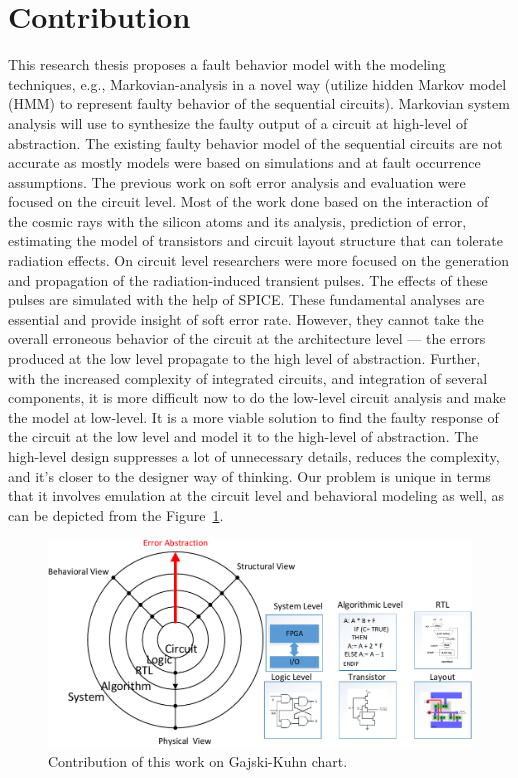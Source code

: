   
\section{Contribution}

This research thesis proposes a fault behavior model with the modeling techniques, e.g., Markovian-analysis in a novel way (utilize hidden Markov model (HMM) to represent faulty behavior of the sequential circuits). Markovian system analysis will use to synthesize the faulty output of a circuit at high-level of abstraction. The existing faulty behavior model of the sequential circuits are not accurate as mostly models were based on simulations and at fault occurrence assumptions. 
The previous work on soft error analysis and evaluation were focused on the circuit level. Most of the work done based on the interaction of the cosmic rays with the silicon atoms and its analysis, prediction of error, estimating the model of transistors and circuit layout structure that can tolerate radiation effects. On circuit level researchers were more focused on the generation and propagation of the radiation-induced transient pulses. The effects of these pulses are simulated with the help of SPICE. These fundamental analyses are essential and provide insight of soft error rate. However, they cannot take the overall erroneous behavior of the circuit at the architecture level --- the errors produced at the low level propagate to the high level of abstraction. Further, with the increased complexity of integrated circuits, and integration of several components, it is more difficult now to do the low-level circuit analysis and make the model at low-level. It is a more viable solution to find the faulty response of the circuit at the low level and model it to the high-level of abstraction. The high-level design suppresses a lot of unnecessary details, reduces the complexity, and it's closer to the designer way of thinking. Our problem is unique in terms that it involves emulation at the circuit level and behavioral modeling as well, as can be depicted from the Figure~\ref{fig:ychart}.

\begin{figure}[tb!]
 \centering
  \captionsetup{justification=centering}    
   \includegraphics[scale=0.8]{Figures/ychart-block.pdf}
   \caption{Contribution of this work on Gajski-Kuhn chart.}
\label{fig:ychart}
\end{figure}

